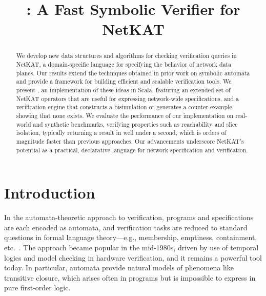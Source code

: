 \documentclass[acmsmall,dvipsnames,nonacm]{acmart}
\begin{document}
\acmDOI{}
\acmConference[]{}{}{}


\title{\KATch: A Fast Symbolic Verifier for NetKAT}

\begin{abstract}
  We develop new data structures and algorithms for checking
  verification queries in NetKAT, a domain-specific language for
  specifying the behavior of network data planes. Our results extend
  the techniques obtained in prior work on symbolic automata and
  provide a framework for building efficient and scalable verification
  tools. We present \KATch, an implementation of these ideas in Scala,
  featuring an extended set of NetKAT operators that are useful for expressing
  network-wide specifications, and a verification engine that
  constructs a bisimulation or generates a counter-example
  showing that none exists. We evaluate the performance of our
  implementation on real-world and synthetic benchmarks, verifying
  properties such as reachability and slice isolation, typically
  returning a result in well under a second, which is orders of
  magnitude faster than previous approaches.
  Our advancements underscore NetKAT's potential as a practical, declarative language for network specification and verification.
\end{abstract}

\maketitle

\section{Introduction}

In the automata-theoretic approach to verification, programs and
specifications are each encoded as automata, and verification tasks
are reduced to standard questions in formal language theory---e.g.,
membership, emptiness, containment,
etc.~\cite{Vardi1986}. The approach became popular in
the mid-1980s, driven by use of temporal logics and model checking in
hardware verification, and it remains a powerful tool today. In
particular, automata provide natural models of phenomena like
transitive closure, which arises often in programs but is impossible
to express in pure first-order logic.
\end{document}
